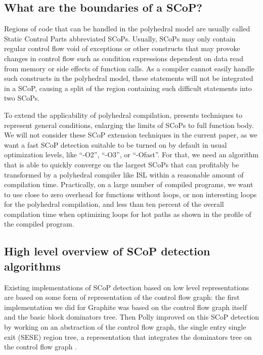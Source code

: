 \documentclass{sigplanconf}
\begin{document}
\subsection{What are the boundaries of a SCoP?}

Regions of code that can be handled in the polyhedral model are usually called
Static Control Parts abbreviated SCoPs.  Usually, SCoPs may only contain regular
control flow void of exceptions or other constructs that may provoke changes in
control flow such as condition expressions dependent on data read from memory or
side effects of function calls.  As a compiler cannot easily handle such
constructs in the polyhedral model, these statements will not be integrated in a
SCoP, causing a split of the region containing such difficult statements into
two SCoPs.

To extend the applicability of polyhedral compilation, \cite{scopExtend}
presents techniques to represent general conditions, enlarging the limits of
SCoPs to full function body.  We will not consider these SCoP extension
techniques in the current paper, as we want a fast SCoP detection suitable to be
turned on by default in usual optimization levels, like ``-O2'', ``-O3'', or
``-Ofast''.  For that, we need an algorithm that is able to quickly converge on
the largest SCoPs that can profitably be transformed by a polyhedral compiler
like ISL \cite{verdoolaege2010isl} within a reasonable amount of compilation time.
Practically, on a large number of compiled programs, we want to use close to
zero overhead for functions without loops, or non interesting loops for the
polyhedral compilation, and less than ten percent of the overall compilation
time when optimizing loops for hot paths as shown in the profile of the compiled
program.

\subsection{High level overview of SCoP detection algorithms}

Existing implementations of SCoP detection based on low level representations
are based on some form of representation of the control flow graph: the first
implementation we did for Graphite \cite{graphite} was based on the control
flow graph itself and the basic block dominators tree.  Then Polly improved on
this SCoP detection \cite{polly} by working on an abstraction of the control flow graph, the
single entry single exit (SESE) region tree, a representation that integrates
the dominators tree on the control flow graph \cite{sese}.
\end{document}
